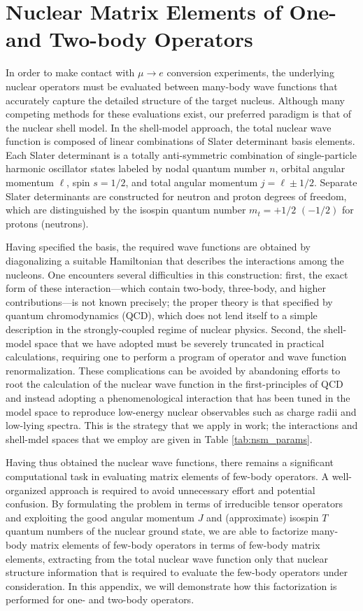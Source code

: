 \documentclass{book}[letterpaper,12pt]
\begin{document}
\chapter{Nuclear Matrix Elements of One- and Two-body Operators}
\label{app:density}
\thispagestyle{headings}
In order to make contact with $\mu\rightarrow e$ conversion experiments, the underlying nuclear operators must be evaluated between many-body wave functions that accurately capture the detailed structure of the target nucleus. Although many competing methods for these evaluations exist, our preferred paradigm is that of the nuclear shell model. In the shell-model approach, the total nuclear wave function is composed of linear combinations of Slater determinant basis elements. Each Slater determinant is a totally anti-symmetric combination of single-particle harmonic oscillator states labeled by nodal quantum number $n$, orbital angular momentum $\ell$, spin $s=1/2$, and total angular momentum $j=\ell\pm 1/2$. Separate Slater determinants are constructed for neutron and proton degrees of freedom, which are distinguished by the isospin quantum number $m_t=+1/2$ $(-1/2)$ for protons (neutrons). 

Having specified the basis, the required wave functions are obtained by diagonalizing a suitable Hamiltonian that describes the interactions among the nucleons. One encounters several difficulties in this construction: first, the exact form of these interaction---which contain two-body, three-body, and higher contributions---is not known precisely; the proper theory is that specified by quantum chromodynamics (QCD), which does not lend itself to a simple description in the strongly-coupled regime of nuclear physics. Second, the shell-model space that we have adopted must be severely truncated in practical calculations, requiring one to perform a program of operator and wave function renormalization. These complications can be avoided by abandoning efforts to root the calculation of the nuclear wave function in the first-principles of QCD and instead adopting a phenomenological interaction that has been tuned in the model space to reproduce low-energy nuclear observables such as charge radii and low-lying spectra. This is the strategy that we apply in work; the interactions and shell-mdel spaces that we employ are given in Table \ref{tab:nsm_params}. 

Having thus obtained the nuclear wave functions, there remains a significant computational task in evaluating matrix elements of few-body operators. A well-organized approach is required to avoid unnecessary effort and potential confusion. By formulating the problem in terms of irreducible tensor operators and exploiting the good angular momentum $J$ and (approximate) isospin $T$ quantum numbers of the nuclear ground state, we are able to factorize many-body matrix elements of few-body operators in terms of few-body matrix elements, extracting from the total nuclear wave function only that nuclear structure information that is required to evaluate the few-body operators under consideration. In this appendix, we will demonstrate how this factorization is performed for one- and two-body operators.
\end{document}
